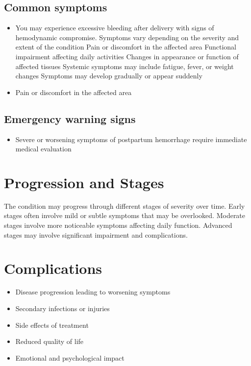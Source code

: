 \subsection{Common symptoms}
\begin{itemize}[noitemsep]
  \item You may experience excessive bleeding after delivery with signs of hemodynamic compromise. Symptoms vary depending on the severity and extent of the condition Pain or discomfort in the affected area Functional impairment affecting daily activities Changes in appearance or function of affected tissues Systemic symptoms may include fatigue, fever, or weight changes Symptoms may develop gradually or appear suddenly
  \item Pain or discomfort in the affected area
  \end{itemize}

\subsection{Emergency warning signs}
\begin{itemize}[noitemsep]
  \item Severe or worsening symptoms of postpartum hemorrhage require immediate medical evaluation
\end{itemize}
\section{Progression and Stages}
The condition may progress through different stages of severity over time. Early stages often involve mild or subtle symptoms that may be overlooked. Moderate stages involve more noticeable symptoms affecting daily function. Advanced stages may involve significant impairment and complications.
\section{Complications}
\begin{itemize}[noitemsep]
  \item Disease progression leading to worsening symptoms
  \item Secondary infections or injuries
  \item Side effects of treatment
  \item Reduced quality of life
  \item Emotional and psychological impact
\end{itemize}

